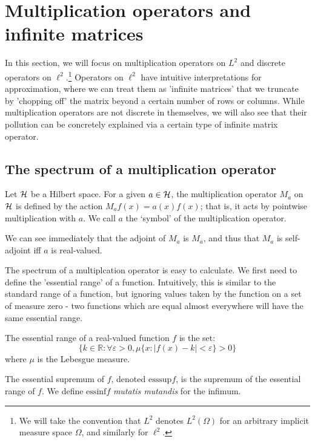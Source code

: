 \documentclass[../main.tex]{subfiles}
\begin{document}
\section{Multiplication operators and infinite matrices}
In this section, we will focus on multiplication operators on $L^2$ and
discrete operators on $\ell^2$.\footnote{We will take the convention that
$L^2$ denotes $L^2(\Omega)$ for an arbitrary implicit measure space $\Omega$,
and similarly for $\ell^2$.}
Operators on $\ell^2$ have intuitive
interpretations for approximation, where we can treat them as 'infinite
matrices' that we truncate by 'chopping off' the matrix beyond a certain number
of rows or columns. While multiplication operators are not discrete in
themselves, we will also see that their pollution can be concretely explained
via a certain type of infinite matrix operator.

\subsection{The spectrum of a multiplication operator}
\begin{definition}
Let $\mathcal{H}$ be a Hilbert space. For a given $a \in \mathcal{H}$, the
multiplication operator $M_a$ on $\mathcal{H}$ is defined by the action
$M_af(x) = a(x)f(x)$; that is, it acts by pointwise multiplication with
$a$. We call $a$ the `symbol' of the multiplication operator.
\end{definition}

We can see immediately that the adjoint of $M_a$ is $M_{\overline{a}}$, and thus
that $M_a$ is self-adjoint iff $a$ is real-valued.

The spectrum of a multiplcation operator is easy to calculate. We first
need to define the 'essential range' of a function. Intuitively, this is
similar to the standard range of a function, but ignoring values taken by
the function on a set of measure zero - two functions which are equal
almost everywhere will have the same essential range.

\begin{definition}
\label{defn:essential-range}
The essential range of a real-valued function $f$ is the set:
 $$\{k \in \mathbb{R} : \forall \varepsilon > 0, \mu\{x : |f(x) - k| < \varepsilon\} > 0\}$$
where $\mu$ is the Lebesgue measure.
  
The essential supremum of $f$, denoted $\mathrm{esssup}f$, is the supremum of
the essential range of $f$. We define $\mathrm{essinf}f$ \emph{mutatis
mutandis} for the infimum.
\end{definition}
\end{document}
